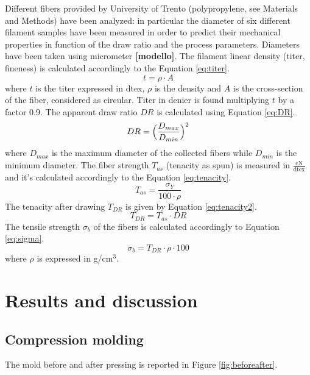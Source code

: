 \documentclass[a4paper, 11pt]{article}
\begin{document}
Different fibers provided by University of Trento (polypropylene, see Materials and Methods) have been analyzed: in particular the diameter of six different filament samples have been measured in order to predict their mechanical properties in function of the draw ratio and the process parameters. 
Diameters have been taken using micrometer \textbf{[modello]}. The filament linear density (titer, fineness) is calculated accordingly to the Equation \ref{eq:titer}. 
\begin{equation}
	t = \rho \cdot A
	\label{eq:titer}
\end{equation}
where $t$ is the titer expressed in dtex, $\rho$ is the density and $A$ is the cross-section of the fiber, considered as circular. Titer in denier is found multiplying $t$ by a factor 0.9. The apparent draw ratio $DR$ is calculated using Equation \ref{eq:DR}. 
\begin{equation}
	DR = \Bigl(\frac{D_{max}}{D_{min}}\Bigr)^2
	\label{eq:DR}
\end{equation}
where $D_{max}$ is the maximum diameter of the collected fibers while $D_{min}$ is the minimum diameter. The fiber strength $T_{as}$ (tenacity as spun) is measured in $\frac{\text{cN}}{\text{dtex}}$ and it's calculated accordingly to the Equation \ref{eq:tenacity}. 
\begin{equation}
	T_{as} = \frac{\sigma_Y}{100\cdot \rho}
	\label{eq:tenacity}
\end{equation}
The tenacity after drawing $T_{DR}$ is given by Equation \ref{eq:tenacity2}. 
\begin{equation}
	T_{DR} = T_{as}\cdot DR
	\label{eq:tenacity2}
\end{equation}
The tensile strength $\sigma_b$ of the fibers is calculated accordingly to Equation \ref{eq:sigma}.
\begin{equation}
	\sigma_{b} = T_{DR}\cdot \rho \cdot 100
	\label{eq:sigma}
\end{equation}
where $\rho$ is expressed in g/cm$^3$. 

\newpage

\section{Results and discussion}

\subsection{Compression molding}

The mold before and after pressing is reported in Figure \ref{fig:beforeafter}. 
\end{document}
